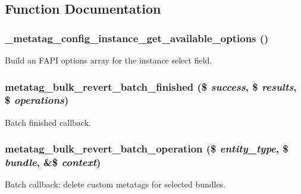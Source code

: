 \subsection{Function Documentation}
\hypertarget{metatag_8admin_8inc_a7be401cb17d6ed4b506e3d9257a5a90b}{
\subsubsection[{\_\-metatag\_\-config\_\-instance\_\-get\_\-available\_\-options}]{\setlength{\rightskip}{0pt plus 5cm}\_\-metatag\_\-config\_\-instance\_\-get\_\-available\_\-options ()}}
\label{metatag_8admin_8inc_a7be401cb17d6ed4b506e3d9257a5a90b}
Build an FAPI options array for the instance select field. \hypertarget{metatag_8admin_8inc_a3fae24225b7ba1a63a6317b49c147094}{
\subsubsection[{metatag\_\-bulk\_\-revert\_\-batch\_\-finished}]{\setlength{\rightskip}{0pt plus 5cm}metatag\_\-bulk\_\-revert\_\-batch\_\-finished (\$ {\em success}, \/  \$ {\em results}, \/  \$ {\em operations})}}
\label{metatag_8admin_8inc_a3fae24225b7ba1a63a6317b49c147094}
Batch finished callback. \hypertarget{metatag_8admin_8inc_a390b69e3ff58bff4a023797722f91314}{
\subsubsection[{metatag\_\-bulk\_\-revert\_\-batch\_\-operation}]{\setlength{\rightskip}{0pt plus 5cm}metatag\_\-bulk\_\-revert\_\-batch\_\-operation (\$ {\em entity\_\-type}, \/  \$ {\em bundle}, \/  \&\$ {\em context})}}
\label{metatag_8admin_8inc_a390b69e3ff58bff4a023797722f91314}
Batch callback: delete custom metatags for selected bundles. 

